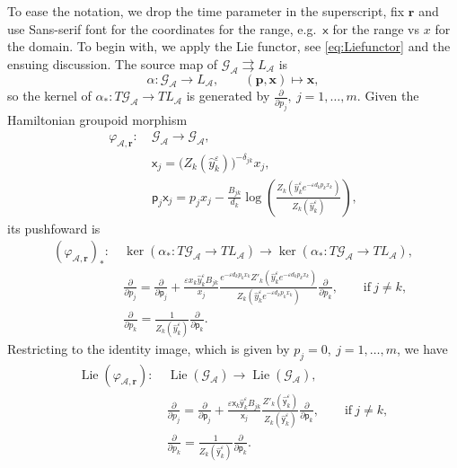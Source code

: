 \documentclass{amsart}
\numberwithin{equation}{section}
\newcommand{\bfp}{{\boldsymbol{p}}}
\newcommand{\bfr}{{\boldsymbol{r}}}
\newcommand{\bfx}{{\boldsymbol{x}}}
\newcommand{\sfx}{{\mathsf{x}}}
\newcommand{\sfy}{{\mathsf{y}}}
\newcommand{\sfp}{{\mathsf{p}}}
\newcommand{\cA}{\mathcal{A}}
\newcommand{\cG}{\mathcal{G}}
\newcommand{\Lie}{\operatorname{Lie}}
\newcommand{\rra}{\rightrightarrows}
\begin{document}
To ease the notation, we drop the time parameter in the superscript, fix $\bfr$ and use Sans-serif font for the coordinates for the range, e.g.\ $\sfx$ for the range vs $x$ for the domain.
To begin with, we apply the Lie functor, see \eqref{eq:Liefunctor} and the ensuing discussion.
The source map of $\cG_\cA \rra L_\cA$ is 
\[
	\alpha: \cG_\cA \to L_\cA, \qquad (\bfp, \bfx) \mapsto \bfx,
\]
so the kernel of $\alpha_*: T\cG_\cA \to TL_\cA$ is generated by $\frac{\partial}{\partial p_j}, \> j = 1, \ldots, m$.
Given the Hamiltonian groupoid morphism
\begin{align*}
	\varphi_{\cA,\bfr}: ~& \cG_\cA \to \cG_\cA, \\
	& \sfx_j = \big(Z_k(\hat y_k^\varepsilon)\big)^{-\delta_{jk}}x_j, \\
	& \sfp_j \sfx_j = p_jx_j-\frac{B_{jk}}{d_k}\log\left(\frac{Z_k\left(\hat y_k^\varepsilon e^{-\varepsilon d_kp_kx_k}\right)}{Z_k(\hat y_k^\varepsilon)}\right),
\end{align*}
its pushfoward is
\begin{align*}
	\left(\varphi_{\cA,\bfr}\right)_*: ~& \ker(\alpha_*: T\cG_\cA \to TL_\cA) \to \ker(\alpha_*: T\cG_\cA \to TL_\cA),  \\
	& \frac{\partial}{\partial p_j} 
	= \frac{\partial}{\partial \sfp_j} + \frac{\varepsilon x_k \hat{y}_k^\varepsilon B_{jk}}{x_j} \frac{ e^{-\varepsilon d_k p_k x_k} Z'_k\left(\hat y_k^\varepsilon e^{-\varepsilon d_k p_k x_k}\right)}{Z_k\left(\hat y_k^\varepsilon e^{-\varepsilon d_k p_k x_k}\right)} \frac{\partial}{\partial p_k}, \qquad \text{if}~ j \ne k, \\
	& \frac{\partial}{\partial p_k}
	= \frac{1}{Z_k(\hat y_k^\varepsilon)}\frac{\partial}{\partial \sfp_k}.
\end{align*}
Restricting to the identity image, which is given by $p_j = 0, \> j = 1, \ldots, m$, we have
\begin{align*}
	\Lie \left(\varphi_{\cA,\bfr} \right): ~& \Lie \left(\cG_\cA \right) \to \Lie \left( \cG_\cA \right),  \\
	& \frac{\partial}{\partial p_j}
	= \frac{\partial}{\partial \sfp_j} + \frac{\varepsilon \sfx_k \hat{\sfy}_k^\varepsilon B_{jk}}{\sfx_j} \frac{Z'_k\left(\hat \sfy_k^\varepsilon \right)}{Z_k\left(\hat \sfy_k^\varepsilon \right)} \frac{\partial}{\partial \sfp_k}, \qquad \text{if}~ j \ne k, \\
	& \frac{\partial}{\partial p_k} 
	= \frac{1}{Z_k(\hat{\sfy}_k^\varepsilon)}\frac{\partial}{\partial \sfp_k}.
\end{align*}
\end{document}
